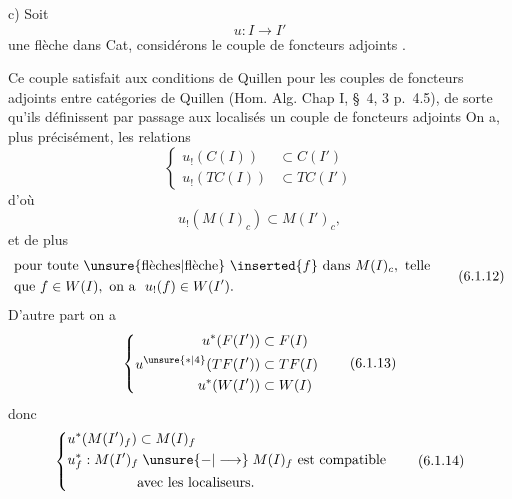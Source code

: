 c) Soit 
\[
 u:I\longrightarrow I'
\]
une flèche  dans Cat, considérons
le couple de foncteurs adjoints
.


Ce couple satisfait aux conditions de Quillen
pour les couples de foncteurs adjoints entre
catégories de Quillen (Hom. Alg. Chap I,
\S~4,  3 p.~4.5), de sorte qu'ils
définissent par passage aux localisés un
couple de foncteurs adjoints
On a, plus précisément, les relations
\[
\left\{\begin{aligned}
 u_{!}(C(I))&\subset C(I')\\
 u_{!}(TC(I))&\subset TC(I')
\end{aligned}\right.\tag*{(6.1.10)}
\]
d'où
\[
 u_{!}(M(I)_{c})\subset M(I')_{c},\tag*{(6.1.11)}
\]
et de plus
\[
\begin{aligned}
 &\text{pour toute \unsure{flèches|flèche} }\inserted{f}\ \text{dans }M(I)_{c},\text{ telle}\\
 &\text{que }f\in W(I),\ \text{on a }\ u_{!}(f)\in W(I').
\end{aligned}\tag*{(6.1.12)}
\]
D'autre part on a
\[
\left\{\begin{aligned}
 u^{*}(F(I'))&\subset F(I)\\
 u^{\unsure{*|4}}(TF(I'))&\subset TF(I)\\
 u^{*}(W(I'))&\subset W(I)
\end{aligned}\right.\tag*{(6.1.13)}
\]
donc
\[
\left\{\begin{aligned}
 &u^{*}(M(I')_{f})\subset M(I)_{f}\\
 &u^{*}_{f}:M(I')_{f}\mathrel{\unsure{-|\longrightarrow}}M(I)_{f}\ \text{est compatible}\\
 &\hspace{5em}\text{avec les localiseurs}.
\end{aligned}\right.\tag*{(6.1.14)}
\]

